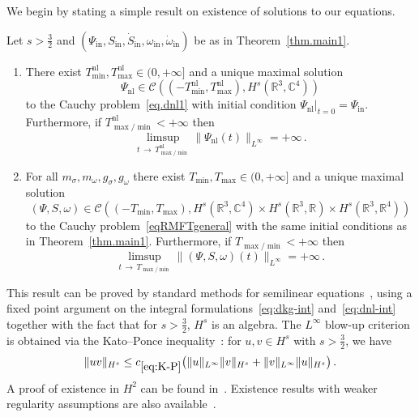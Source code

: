 \documentclass[10pt]{amsart}
\theoremstyle{definition}\newtheorem{defi}[theo]{Definition}\newtheorem{rema}[theo]{Remark}\newtheorem{exam}[theo]{Example}\newtheorem{exem}[theo]{Example}\newtheorem{nota}[theo]{Notation}
\newcommand{\rmin}{\mathrm{in}}
\newcommand{\nl}{\mathrm{nl}}
\newcommand{\cC}{\mathcal{C}}
\newcommand\R{\mathbb{R}}
\newcommand\C{\mathbb{C}}
\newcommand\ii{{\ensuremath {\infty}}}
\newcommand*{\romanenumi}{\renewcommand*{\theenumi}{\roman{enumi}}}
\begin{document}
We begin by stating a simple result on existence of solutions to our equations.

\begin{prop}\label{prop:exist}
Let $s>\tfrac32$ and $(\Psi_\rmin, S_\rmin, \dot S_\rmin, \omega_\rmin, \dot \omega_\rmin)$ be as in Theorem~\ref{thm.main1}.
\begin{enumerate}\romanenumi
\item\label{pt1.prop}
There exist $T_{\min}^{\nl}, T_{\max}^{\nl}\in(0,+\infty]$ and a unique maximal solution
\[
\Psi_{\nl}\in\cC\left(\left(-T_{\min}^{\nl}, T_{\max}^{\nl}\right),H^s\left(\R^3, \C^4\right)\right)
\]
to the Cauchy problem~\eqref{eq.dnl1} with initial condition $\Psi_{\nl}\vert_{t=0}=\Psi_{\rmin}$. Furthermore, if $T_{\max/\min}^{\nl}<+\infty$ then
\[
\limsup_{t\,\to\,T_{\max/\min}^{\nl}}\|\Psi_{\nl}(t)\|_{L^\infty}= +\infty\,.
\]
\item\label{pt2.prop}
For all $m_\sigma, m_\omega, g_\sigma, g_\omega$ there exist $T_{\min}, T_{\max}\in(0,+\infty]$ and a unique maximal solution
\[
(\Psi,S,\omega)\in \cC\left(\left(-T_{\min}, T_{\max}\right),H^s\left(\R^3, \C^4\right)\times H^s\left(\R^3,\R\right)\times H^s\left(\R^3, \R^4\right)\right)
\]
to the Cauchy problem~\eqref{eqRMFTgeneral} with the same initial conditions as in Theorem~\ref{thm.main1}. Furthermore, if $T_{\max/\min}<+\infty$ then
\begin{equation}\label{eq:blowup-crit}
\limsup_{t\,\to\,T_{\max/\min}}\|(\Psi,S,\omega)(t)\|_{L^\infty} = +\infty\,.
\end{equation}
\end{enumerate}
\end{prop}

This result can be proved by standard methods for semilinear equations~\cite{cazenave2003}, using a fixed point argument on the integral formulations~\eqref{eq:dkg-int} and~\eqref{eq:dnl-int} together with the fact that for $s>\tfrac32$, $H^s$ is an algebra. The $L^\ii$ blow-up criterion is obtained via the Kato--Ponce inequality~\cite[Lemma~X.4]{KatPon-88}: for $u,v\in H^{s}$ with $s>\tfrac32$, we have
\begin{equation}\label{eq:K-P}
\|uv\|_{H^s}\leq c_{\eqref{eq:K-P}}\big(\|u\|_{L^\infty}\|v\|_{H^s} + \|v\|_{L^\infty}\|u\|_{H^s}\big)\,.
\end{equation}
A proof of existence in $H^2$ can be found in~\cite{najman1992}. Existence results with weaker regularity assumptions are also available~\cite{bejenaru2015, bejenaru2017, candy2018,escobedo1997,machihara2003, machihara2005}.
\end{document}

